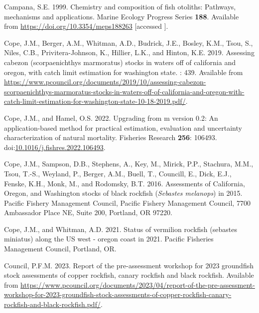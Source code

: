 \documentclass[11pt,
  letterpaper,
]{article}
\newlength{\cslhangindent}
\newenvironment{CSLReferences}[2] %
 {%
  \setlength{\parindent}{0pt}
  \ifodd #1 \everypar{\setlength{\hangindent}{\cslhangindent}}\ignorespaces\fi
  \ifnum #2 > 0
  \setlength{\parskip}{#2\baselineskip}
  \fi
 }%
 {}
\begin{document}
\begin{CSLReferences}{1}{0}
\leavevmode{}%
Campana, S.E. 1999. Chemistry and composition of fish otoliths: Pathways, mechanisms and applications. Marine Ecology Progress Series \textbf{188}. Available from \url{https://doi.org/10.3354/meps188263} {[}accessed {]}.

\leavevmode{}%
Cope, J.M., Berger, A.M., Whitman, A.D., Budrick, J.E., Bosley, K.M., Tsou, S., Niles, C.B., Privitera-Johnson, K., Hillier, L.K., and Hinton, K.E. 2019. Assessing cabezon (scorpaenichthys marmoratus) stocks in waters off of california and oregon, with catch limit estimation for washington state. : 439. Available from \url{https://www.pcouncil.org/documents/2019/10/assessing-cabezon-scorpaenichthys-marmoratus-stocks-in-waters-off-of-california-and-oregon-with-catch-limit-estimation-for-washington-state-10-18-2019.pdf/}.

\leavevmode{}%
Cope, J.M., and Hamel, O.S. 2022. Upgrading from m version 0.2: An application-based method for practical estimation, evaluation and uncertainty characterization of natural mortality. Fisheries Research \textbf{256}: 106493. doi:\href{https://doi.org/10.1016/j.fishres.2022.106493}{10.1016/j.fishres.2022.106493}.

\leavevmode{}%
Cope, J.M., Sampson, D.B., Stephens, A., Key, M., Mirick, P.P., Stachura, M.M., Tsou, T.-S., Weyland, P., Berger, A.M., Buell, T., Councill, E., Dick, E.J., Fenske, K.H., Monk, M., and Rodomsky, B.T. 2016. Assessments of {California}, {Oregon}, and {Washington} stocks of black rockfish (\emph{{Sebastes} melanops}) in 2015. Pacific Fishery Management Council, Pacific Fishery Management Council, 7700 Ambassador Place NE, Suite 200, Portland, OR 97220.

\leavevmode{}%
Cope, J.M., and Whitman, A.D. 2021. Status of vermilion rockfish (sebastes miniatus) along the {US} west - oregon coast in 2021. Pacific Fisheries Management Council, Portland, {OR}.

\leavevmode{}%
Council, P.F.M. 2023. Report of the pre-assessment workshop for 2023 groundfish stock assessments of copper rockfish, canary rockfish and black rockfish. Available from \url{https://www.pcouncil.org/documents/2023/04/report-of-the-pre-assessment-workshop-for-2023-groundfish-stock-assessments-of-copper-rockfish-canary-rockfish-and-black-rockfish.pdf/}.


\end{CSLReferences}
\end{document}
